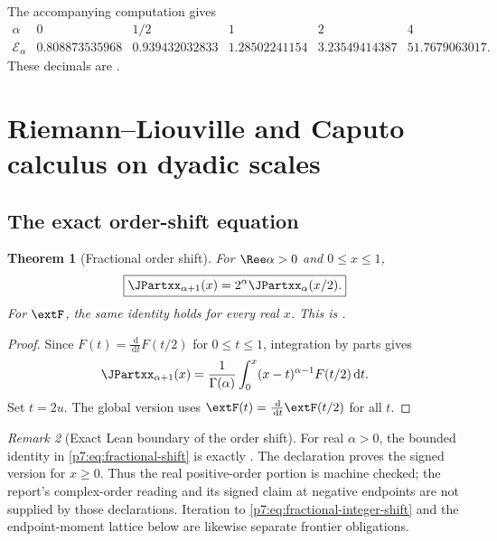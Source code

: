 \documentclass[11pt,oneside]{article}
\newtheorem{theorem}{Theorem}[section]
\theoremstyle{definition}
\theoremstyle{remark}
\newtheorem{remark}[theorem]{Remark}
\newcommand{\dd}{\,\mathrm d}
\newcommand{\1}{\mathbf 1}
\begin{document}
The accompanying computation gives
\begin{equation}
\begin{array}{c|ccccc}
 \alpha&0&1/2&1&2&4\\ \hline
 \mathcal E_\alpha
 &0.808873535968&0.939432032833&1.28502241154&3.23549414387&51.7679063017.
\end{array}
\label{p7:eq:energy-numerics}
\end{equation}
These decimals are \statusnumeric.

\section{Riemann--Liouville and Caputo calculus on dyadic scales}
\label{p7:sec:fractional}

\subsection{The exact order-shift equation}

\begin{theorem}[Fractional order shift]
\label{p7:thm:fractional-shift}
For $\Ree\alpha>0$ and $0\le x\le1$,
\begin{equation}
 \boxed{\JPartxx_{\alpha+1}(x)=2^\alpha\JPartxx_\alpha(x/2).}
 \label{p7:eq:fractional-shift}
\end{equation}
For $\extF$, the same identity holds for every real $x$.  This is \statusproved.
\end{theorem}

\begin{proof}
Since $F(t)=\frac{\dd}{\dd t}F(t/2)$ for $0\le t\le1$, integration by parts gives
\[
 \JPartxx_{\alpha+1}(x)
 =\frac1{\Gamma(\alpha)}\int_0^x(x-t)^{\alpha-1}F(t/2)\dd t.
\]
Set $t=2u$.  The global version uses
$\extF(t)=\frac{\dd}{\dd t}\extF(t/2)$ for all $t$.
\end{proof}

\begin{remark}[Exact Lean boundary of the order shift]
For real \(\alpha>0\), the bounded identity in
\eqref{p7:eq:fractional-shift} is exactly
.  The declaration
 proves the signed version
for $x\ge0$.  Thus the real positive-order portion is machine checked; the report's
complex-order reading and its signed claim at negative endpoints are not supplied by those
declarations.  Iteration to \eqref{p7:eq:fractional-integer-shift} and the endpoint-moment
lattice below are likewise separate frontier obligations.
\end{remark}
\end{document}
